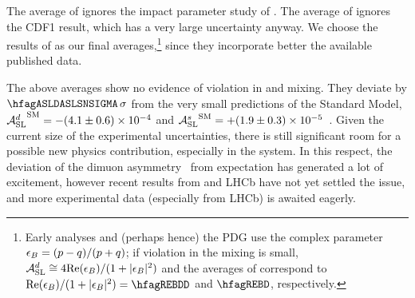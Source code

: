 The average of  %
ignores the impact parameter study of \dzero.
The average of  ignores the CDF1 
result, which has a very large uncertainty anyway.
We choose the results of 
as our final averages,\footnote{
  \label{foot:life_mix:epsilon_B}
  Early analyses and (perhaps hence) the PDG use the complex
  parameter $\epsilon_{B} = (p-q)/(p+q)$; if \CP violation in the mixing is small,
  ${\cal A}_{\rm SL}^d \cong 4 {\rm Re}(\epsilon_{B})/(1+|\epsilon_{B}|^2)$ and the averages of
  correspond to ${\rm Re}(\epsilon_{\B})/(1+|\epsilon_{\B}|^2)=\hfagREBDD$ %
  and $\hfagREBD$, respectively.}
since they incorporate better the available published data. 

The above averages show no evidence of \CP violation in \Bd and \Bs mixing.
They deviate by $\hfagASLDASLSNSIGMA\,\sigma$ from the very small predictions of the Standard Model, 
${{\cal A}_{\rm SL}^d}^{\rm SM} = -(4.1\pm 0.6)\times 10^{-4}$ and 
${{\cal A}_{\rm SL}^s}^{\rm SM} = +(1.9\pm 0.3)\times 10^{-5}$~\cite{Lenz:2011ti,*Lenz:2006hd}.
Given the current size of the experimental uncertainties,
there is still significant room for a possible new physics contribution, especially in the \Bs system. 
In this respect, the deviation of the \dzero dimuon
asymmetry~\cite{Abazov:2013uma,*Abazov:2011yk_mod,*Abazov:2010hv_mod_cont,*Abazov:2010hj_mod_cont,*Abazov:2011yk_cont}
from expectation has generated a lot of excitement, however recent results from \dzero and LHCb 
have not yet settled the issue, and more experimental data (especially from LHCb) is awaited eagerly. 

